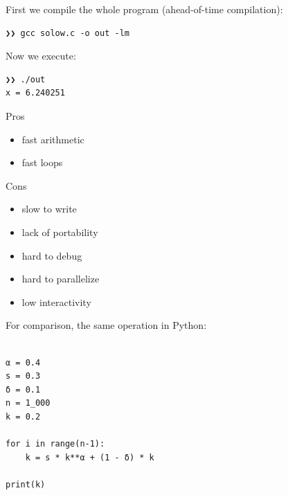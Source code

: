 \begin{frame}[fragile]


    First we compile the whole program (ahead-of-time compilation):
    
    \vspace{0.5em}
    \begin{verbatim}
❯❯ gcc solow.c -o out -lm
    \end{verbatim}



    \vspace{0.5em}
    \vspace{0.5em}
    \vspace{0.5em}
    Now we execute:

    \vspace{0.5em}
    \begin{verbatim}
❯❯ ./out 
x = 6.240251
    \end{verbatim}

\end{frame}

\begin{frame}

    Pros

    \begin{itemize}
        \item fast arithmetic
        \item fast loops
    \end{itemize}


    \vspace{0.5em}

    Cons

    \begin{itemize}
        \item slow to write
        \item lack of portability
        \item hard to debug
        \item hard to parallelize
        \item low interactivity
    \end{itemize}

\end{frame}

\begin{frame}[fragile]


    For comparison, the same operation in Python:
    
    \begin{verbatim}

α = 0.4
s = 0.3
δ = 0.1
n = 1_000
k = 0.2

for i in range(n-1):
    k = s * k**α + (1 - δ) * k

print(k)

    \end{verbatim}

\end{frame}

